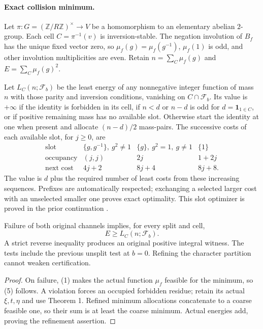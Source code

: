 \paragraph{Exact collision minimum.}
Let $\pi:G=(\mathbb Z/R\mathbb Z)^\times\to V$ be a homomorphism to an
 elementary abelian $2$-group. Each cell $C=\pi^{-1}(v)$ is inversion-stable.
The negation involution of $B_f$ has the unique fixed vector zero, so
$\mu_f(g)=\mu_f(g^{-1})$, $\mu_f(1)$ is odd, and other involution
multiplicities are even. Retain $n=\sum_C\mu_f(g)$ and $E=\sum_C\mu_f(g)^2$.

Let $L_C(n;\mathcal F_b)$ be the least energy of any nonnegative integer
function of mass $n$ with those parity and inversion conditions, vanishing
on $C\cap\mathcal F_b$. Its value is $+\infty$ if the identity is
forbidden in its cell, if $n<d$ or $n-d$ is odd for $d=\mathbf1_{1\in C}$,
or if positive remaining mass has no available slot. Otherwise start the
identity at one when present and allocate $(n-d)/2$ mass-pairs. The successive
costs of each available slot, for $j\ge0$, are
\[
 \begin{array}{c|ccc}
 \text{slot}&\{g,g^{-1}\},\ g^2\ne1&\{g\},\ g^2=1,\ g\ne1&\{1\}\\\hline
 \text{occupancy}&(j,j)&2j&1+2j\\
 \text{next cost}&4j+2&8j+4&8j+8.
 \end{array}                                                   \tag{4}
\]
The value is $d$ plus the required number of least costs from these
increasing sequences. Prefixes are automatically respected; exchanging a
selected larger cost with an unselected smaller one proves exact optimality.
This slot optimizer is proved in the prior continuation \cite{Prior}.

\begin{theorem}
Failure of both original channels implies, for every split and cell,
\[
 \boxed{E\ge L_C(n;\mathcal F_b).}                             \tag{5}
\]
A strict reverse inequality produces an original positive integral witness.
The tests include the previous unsplit test at $b=0$. Refining the character
partition cannot weaken certification.
\end{theorem}
\begin{proof}
On failure, (1) makes the actual function $\mu_f$ feasible for the minimum,
so (5) follows. A violation forces an occupied forbidden residue; retain
its actual $\xi,t,\eta$ and use Theorem 1. Refined minimum allocations
concatenate to a coarse feasible one, so their sum is at least the coarse
minimum. Actual energies add, proving the refinement assertion.
\end{proof}

